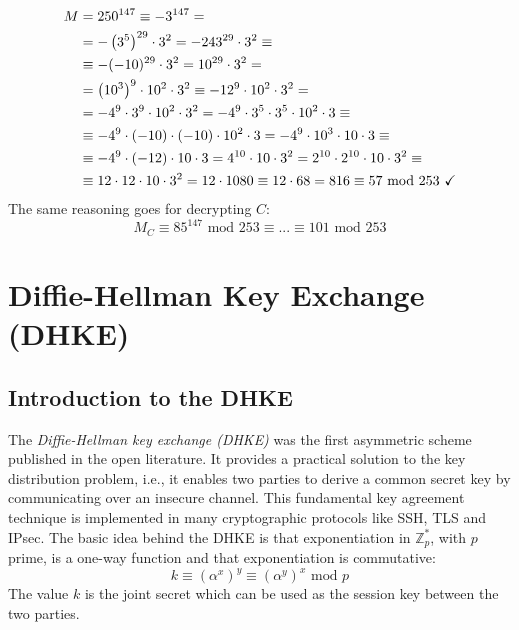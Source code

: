 \documentclass[11pt, a4paper]{article}
\newcommand{\mymod}{
    \text{ mod }
}
\begin{document}
\begin{align*}
    M&=250^{147}\equiv-3^{147}=\\
    &=-\left(3^5\right)^{29}\cdot3^2=-243^{29}\cdot3^2\equiv\\
    &\equiv-(-10)^{29}\cdot3^2=10^{29}\cdot3^2=\\
    &=\left(10^3\right)^9\cdot10^2\cdot3^2\equiv-12^9\cdot10^2\cdot3^2=\\
    &=-4^9\cdot3^9\cdot10^2\cdot3^2=-4^9\cdot3^5\cdot3^5\cdot10^2\cdot3\equiv\\
    &\equiv-4^9\cdot(-10)\cdot(-10)\cdot10^2\cdot3=-4^9\cdot10^3\cdot10\cdot3\equiv\\
    &\equiv-4^9\cdot(-12)\cdot10\cdot3=4^{10}\cdot10\cdot3^2=2^{10}\cdot2^{10}\cdot10\cdot3^2\equiv\\
    &\equiv12\cdot12\cdot10\cdot3^2=12\cdot1080\equiv12\cdot68=816\equiv57\mymod253\text{ \checkmark}
\end{align*}
The same reasoning goes for decrypting $C$:
$$M_C\equiv85^{147}\mymod253\equiv...\equiv101\mymod253$$

\newpage
\section{Diffie-Hellman Key Exchange (DHKE)}
\subsection{Introduction to the DHKE}
The \textit{Diffie-Hellman key exchange (DHKE)} was the first asymmetric scheme published in the open literature. It provides a practical solution to the key distribution problem, i.e., it enables two parties to derive a common secret key by communicating over an insecure channel. This fundamental key agreement technique is implemented in many cryptographic protocols like SSH, TLS and IPsec. The basic idea behind the DHKE is that exponentiation in $\mathbb{Z}_p^*$, with $p$ prime, is a one-way function and that exponentiation is commutative:
$$k\equiv(\alpha^x)^y\equiv(\alpha^y)^x\mymod p$$
The value $k$ is the joint secret which can be used as the session key between the two parties.
\end{document}
